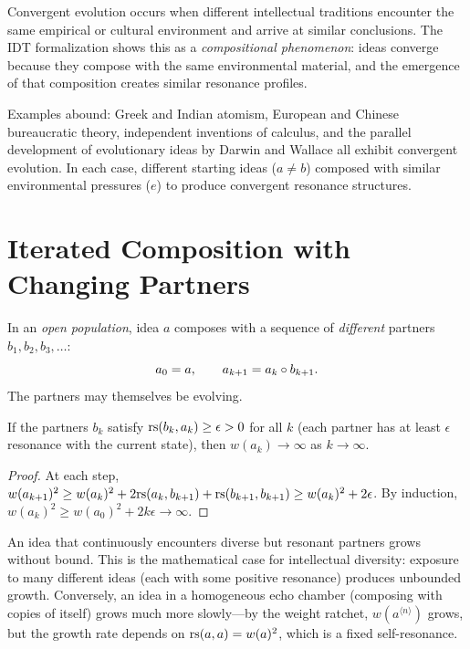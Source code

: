 \begin{remark}
Convergent evolution occurs when different intellectual traditions encounter
the same empirical or cultural environment and arrive at similar conclusions.
The IDT formalization shows this as a \emph{compositional phenomenon}: ideas
converge because they compose with the same environmental material, and the
emergence of that composition creates similar resonance profiles.

Examples abound: Greek and Indian atomism, European and Chinese bureaucratic
theory, independent inventions of calculus, and the parallel development
of evolutionary ideas by Darwin and Wallace all exhibit convergent evolution.
In each case, different starting ideas ($a \neq b$) composed with similar
environmental pressures ($e$) to produce convergent resonance structures.
\end{remark}


\section{Iterated Composition with Changing Partners}

\begin{definition}
\label{def:open-population}
In an \emph{open population}, idea $a$ composes with a sequence of
\emph{different} partners $b_1, b_2, b_3, \ldots$:
\[
  a_0 = a, \qquad a_{k+1} = a_k \circ b_{k+1}.
\]
The partners may themselves be evolving.
\end{definition}

\begin{theorem}
\label{thm:weight-divergence}
If the partners $b_k$ satisfy $\mathrm{rs}(b_k, a_k) \geq \epsilon > 0$ for all $k$
(each partner has at least $\epsilon$ resonance with the current state), then
$w(a_k) \to \infty$ as $k \to \infty$.
\end{theorem}

\begin{proof}
At each step, $w(a_{k+1})^2 \geq w(a_k)^2 + 2\mathrm{rs}(a_k, b_{k+1}) +
\mathrm{rs}(b_{k+1}, b_{k+1}) \geq w(a_k)^2 + 2\epsilon$.
By induction, $w(a_k)^2 \geq w(a_0)^2 + 2k\epsilon \to \infty$.
\end{proof}

\begin{interpretation}
\label{interp:diversity}
An idea that continuously encounters diverse but resonant partners grows
without bound.  This is the mathematical case for intellectual diversity:
exposure to many different ideas (each with some positive resonance) produces
unbounded growth.  Conversely, an idea in a homogeneous echo chamber
(composing with copies of itself) grows much more slowly---by the weight
ratchet, $w(a^{\langle n \rangle})$ grows, but the growth rate depends on
$\mathrm{rs}(a, a) = w(a)^2$, which is a fixed self-resonance.
\end{interpretation}

